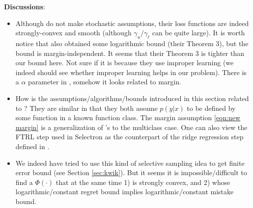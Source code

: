 \documentclass{article}
\begin{document}
\textbf{Discussions}:  \\
\begin{itemize}
    \item Although \cite{hazan2011newtron, foster2018logistic} do not make stochastic assumptions, their loss functions are indeed strongly-convex and smooth (although $\gamma_u/\gamma_\ell$ can be quite large). It is worth notice that \cite{foster2018logistic} also obtained some logarithmic bound (their Theorem 3), but the bound is margin-independent. It seems that their Theorem 3 is tighter than our bound here. Not sure if it is because they use improper learning (we indeed should see whether improper learning helps in our problem). There is a $\alpha$ parameter in \cite{hazan2011newtron}, somehow it looks related to margin.
    \item How is the assumptions/algorithms/bounds introduced in this section related to \cite{pillaud2017exponential}? They are similar in that they both assume $p(y|x)$ to be defined by some function in a known function class. The margin assumption \eqref{eqn:new margin} is a generalization of \cite{pillaud2017exponential}'s to the multiclass case. One can also view the FTRL step used in Selectron as the counterpart of the ridge regression step defined in \cite{pillaud2017exponential}. 
    \item We indeed have tried to use this kind of selective sampling idea to get finite error bound (see Section \ref{sec:kwik}). But it seems it is impossible/difficult to find a $\Phi(\cdot)$ that at the same time 1) is strongly convex, and 2) whose logarithmic/constant regret bound implies logarithmic/constant mistake bound. 
\end{itemize}



\end{document}
